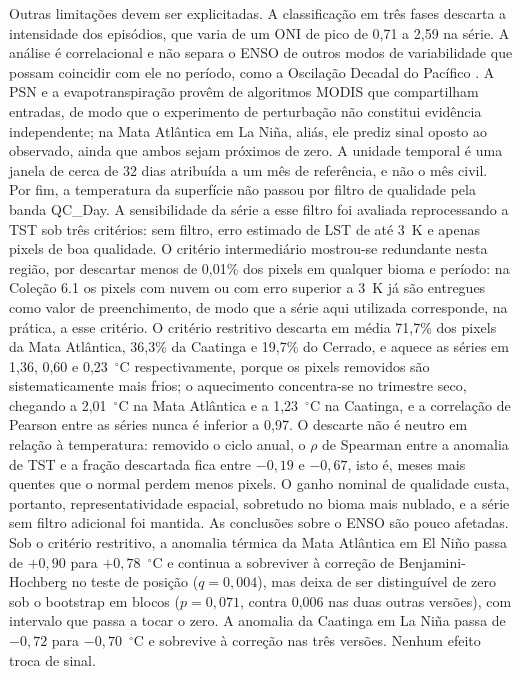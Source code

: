 \documentclass[a4paper,fleqn]{cas-sc}
\begin{document}
Outras limitações devem ser explicitadas. A classificação em três fases descarta a intensidade dos episódios, que varia de um ONI de pico de 0,71 a 2,59 na série. A análise é correlacional e não separa o ENSO de outros modos de variabilidade que possam coincidir com ele no período, como a Oscilação Decadal do Pacífico \citep{kayano2007}. A PSN e a evapotranspiração provêm de algoritmos MODIS que compartilham entradas, de modo que o experimento de perturbação não constitui evidência independente; na Mata Atlântica em La Niña, aliás, ele prediz sinal oposto ao observado, ainda que ambos sejam próximos de zero. A unidade temporal é uma janela de cerca de 32 dias atribuída a um mês de referência, e não o mês civil. Por fim, a temperatura da superfície não passou por filtro de qualidade pela banda QC\_Day. A sensibilidade da série a esse filtro foi avaliada reprocessando a TST sob três critérios: sem filtro, erro estimado de LST de até 3~K e apenas pixels de boa qualidade. O critério intermediário mostrou-se redundante nesta região, por descartar menos de 0,01\% dos pixels em qualquer bioma e período: na Coleção 6.1 os pixels com nuvem ou com erro superior a 3~K já são entregues como valor de preenchimento, de modo que a série aqui utilizada corresponde, na prática, a esse critério. O critério restritivo descarta em média 71,7\% dos pixels da Mata Atlântica, 36,3\% da Caatinga e 19,7\% do Cerrado, e aquece as séries em 1,36, 0,60 e 0,23~$^{\circ}$C respectivamente, porque os pixels removidos são sistematicamente mais frios; o aquecimento concentra-se no trimestre seco, chegando a 2,01~$^{\circ}$C na Mata Atlântica e a 1,23~$^{\circ}$C na Caatinga, e a correlação de Pearson entre as séries nunca é inferior a 0,97. O descarte não é neutro em relação à temperatura: removido o ciclo anual, o $\rho$ de Spearman entre a anomalia de TST e a fração descartada fica entre $-0{,}19$ e $-0{,}67$, isto é, meses mais quentes que o normal perdem menos pixels. O ganho nominal de qualidade custa, portanto, representatividade espacial, sobretudo no bioma mais nublado, e a série sem filtro adicional foi mantida. As conclusões sobre o ENSO são pouco afetadas. Sob o critério restritivo, a anomalia térmica da Mata Atlântica em El Niño passa de $+0{,}90$ para $+0{,}78$~$^{\circ}$C e continua a sobreviver à correção de Benjamini-Hochberg no teste de posição ($q = 0{,}004$), mas deixa de ser distinguível de zero sob o bootstrap em blocos ($p = 0{,}071$, contra 0,006 nas duas outras versões), com intervalo que passa a tocar o zero. A anomalia da Caatinga em La Niña passa de $-0{,}72$ para $-0{,}70$~$^{\circ}$C e sobrevive à correção nas três versões. Nenhum efeito troca de sinal.
\end{document}
